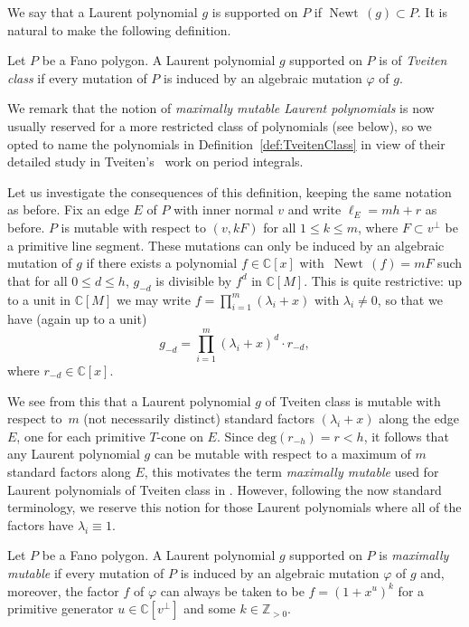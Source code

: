 \documentclass[pdftex]{sigma}
\numberwithin{equation}{section}
\DeclareMathOperator{\Newt}{{Newt \,}}
\newcommand{\CC}{\mathbb{C}}
\newcommand{\ZZ}{\mathbb{Z}}
\begin{document}
We say that a Laurent polynomial $g$ is supported on $P$ if	$\Newt(g) \subset P$.
It is natural to make the following definition.

	\begin{Definition}\label{def:TveitenClass}
Let $P$ be a Fano polygon. A Laurent polynomial $g$ supported on $P$ is of \emph{Tveiten class} if every mutation of $P$ is induced by an algebraic mutation $\varphi$ of $g$.
	\end{Definition}
We remark that the notion of \emph{maximally mutable Laurent polynomials} is now usually reserved for a more restricted class of polynomials (see below), so we opted to name the polynomials in Definition~\ref{def:TveitenClass} in view of their detailed study in Tveiten's~\cite{Tveiten} work on period integrals.

	Let us investigate the consequences of this definition, keeping the same notation as before. Fix an edge $E$ of $P$ with inner normal $v$ and write $\ell_E=mh+r$ as before. $P$ is mutable with respect to $(v, kF)$ for all $1 \leq k \leq m$, where $F \subset v^\perp$ be a primitive line segment.
	These mutations can only be induced by an algebraic mutation of $g$
	if there exists a polynomial $f \in \CC[x]$ with~${\Newt(f)=mF}$ such that for all $0 \leq d \leq h$, $g_{-d}$ is divisible by $f^d$ in $\CC[M]$. This is quite restrictive: up to a unit in $\CC[M]$ we may write
	$f=\prod_{i=1}^{m} (\lambda_i + x)$ with $\lambda_i \neq 0$, so that we have (again up to a unit)
	\[
	g_{-d}=\prod_{i=1}^{m} (\lambda_i + x)^{d} \cdot r_{-d},
	\]
	 where $r_{-d} \in \CC[x]$.

	 We see from this that a Laurent polynomial $g$ of Tveiten class is mutable with respect to~$m$ (not necessarily distinct) standard factors $(\lambda_i + x)$ along the edge $E$, one for each primitive $T$-cone on $E$.
	Since $\text{deg}(r_{-h})=r<h$, it follows that any Laurent polynomial $g$ can be mutable with respect to a maximum of $m$ standard factors along $E$, this motivates the term \emph{maximally mutable} used for Laurent polynomials of Tveiten class in \cite{Tveiten}. However, following the now standard terminology, we reserve this notion for those Laurent polynomials where all of the factors have $\lambda_i \equiv 1$.
	
	\begin{Definition}\label{def:MMLP}
		Let $P$ be a Fano polygon. A Laurent polynomial $g$ supported on $P$ is \emph{maximally mutable} if every mutation of $P$ is induced by an algebraic mutation $\varphi$ of $g$ and, moreover, the factor $f$ of $\varphi$ can always be taken to be $f=(1+x^u)^k$ for a primitive generator $u \in \CC [v^\perp ]$ and some $k\in \ZZ_{>0}$.
	\end{Definition}
\end{document}
